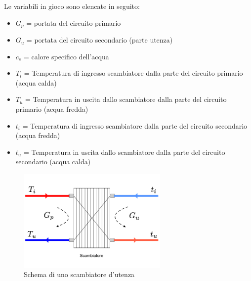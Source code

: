 \documentclass[laurea,oneside,11pt]{USiena_tesiLM}
\begin{document}
Le variabili in gioco sono elencate in seguito:
\begin{itemize}
\item[] $G_p$ = portata del circuito primario
\item[]$G_u$ = portata del circuito secondario (parte utenza)
\item[]$c_s$ = calore specifico dell'acqua
\item[]$T_i$ = Temperatura di ingresso scambiatore dalla parte del circuito primario (acqua calda)
\item[]$T_u$ = Temperatura in uscita dallo scambiatore dalla parte del circuito primario (acqua fredda)
\item[]$t_i$ = Temperatura di ingresso scambiatore dalla parte del circuito secondario (acqua fredda)
\item[]$t_u$ = Temperatura in uscita dallo scambiatore dalla parte del circuito secondario (acqua calda)
\end{itemize}

\begin{figure}[h]
\begin{center}
\includegraphics[width=0.65\textwidth]{figure/scambiatore} %
\caption{Schema di uno scambiatore d'utenza}
\label{fig:scamb}
\end{center}
\end{figure}
\end{document}
